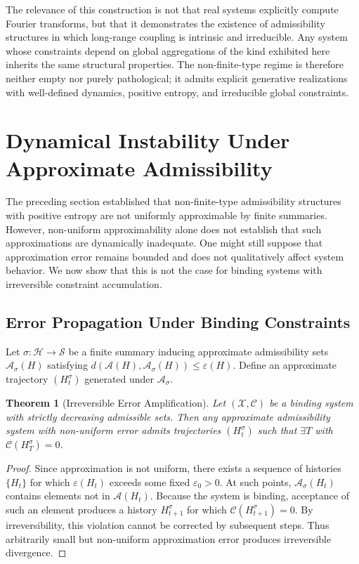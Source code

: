\documentclass[12pt, a4paper]{article}
\theoremstyle{plain}
\newtheorem{theorem}{Theorem}[section]
\theoremstyle{definition}
\theoremstyle{remark}
\begin{document}
The relevance of this construction is not that real systems explicitly compute Fourier transforms, but that it demonstrates the existence of admissibility structures in which long-range coupling is intrinsic and irreducible. Any system whose constraints depend on global aggregations of the kind exhibited here inherits the same structural properties. The non-finite-type regime is therefore neither empty nor purely pathological; it admits explicit generative realizations with well-defined dynamics, positive entropy, and irreducible global constraints.

\section{Dynamical Instability Under Approximate Admissibility}

The preceding section established that non-finite-type admissibility structures with positive entropy are not uniformly approximable by finite summaries. However, non-uniform approximability alone does not establish that such approximations are dynamically inadequate. One might still suppose that approximation error remains bounded and does not qualitatively affect system behavior. We now show that this is not the case for binding systems with irreversible constraint accumulation.

\subsection{Error Propagation Under Binding Constraints}

Let $\sigma : \mathcal{H} \to \mathcal{S}$ be a finite summary inducing approximate admissibility sets $\mathcal{A}_\sigma(H)$ satisfying $d(\mathcal{A}(H), \mathcal{A}_\sigma(H)) \le \varepsilon(H)$. Define an approximate trajectory $(H_t^\sigma)$ generated under $\mathcal{A}_\sigma$.

\begin{theorem}[Irreversible Error Amplification]
Let $(\mathcal{X}, \mathcal{C})$ be a binding system with strictly decreasing admissible sets. Then any approximate admissibility system with non-uniform error admits trajectories $(H_t^\sigma)$ such that $\exists T$ with $\mathcal{C}(H_T^\sigma) = 0$.
\end{theorem}

\begin{proof}
Since approximation is not uniform, there exists a sequence of histories $\{H_t\}$ for which $\varepsilon(H_t)$ exceeds some fixed $\varepsilon_0 > 0$. At such points, $\mathcal{A}_\sigma(H_t)$ contains elements not in $\mathcal{A}(H_t)$. Because the system is binding, acceptance of such an element produces a history $H_{t+1}^\sigma$ for which $\mathcal{C}(H_{t+1}^\sigma) = 0$. By irreversibility, this violation cannot be corrected by subsequent steps. Thus arbitrarily small but non-uniform approximation error produces irreversible divergence.
\end{proof}
\end{document}
